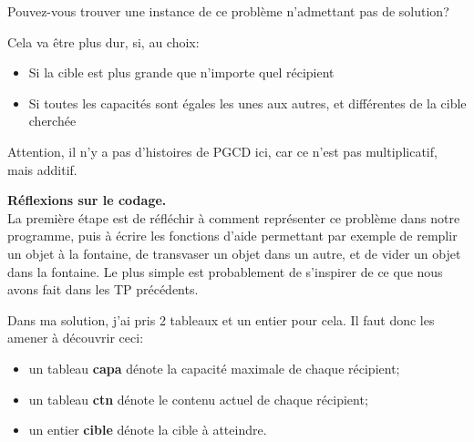 \documentclass[10pt]{article}\usepackage[nu]{esial}%
\begin{document}
\Question Pouvez-vous trouver une instance de ce problème n'admettant pas de
solution?
\begin{Reponse}
  \noindent
  Cela va être plus dur, si, au choix:
  \begin{itemize}
  \item Si la cible est plus grande que n'importe quel récipient
  \item Si toutes les capacités sont égales les unes aux autres, et différentes
    de la cible cherchée
  \end{itemize}
  Attention, il n'y a pas d'histoires de PGCD ici, car ce n'est pas
  multiplicatif, mais additif.
\end{Reponse}

\Exercice\textbf{Réflexions sur le codage.}\\
La première étape est de réfléchir à comment représenter ce problème dans notre
programme, puis à écrire les fonctions d'aide permettant par exemple de remplir
un objet à la fontaine, de transvaser un objet dans un autre, et de vider un
objet dans la fontaine. Le plus simple est probablement de s'inspirer de ce que
nous avons fait dans les TP précédents.

\begin{Reponse}
  Dans ma solution, j'ai pris 2 tableaux et un entier pour cela. Il faut donc
  les amener à découvrir ceci:
  \begin{itemize}
  \item un tableau \textbf{capa} dénote la capacité maximale de chaque récipient;
  \item un tableau \textbf{ctn} dénote le contenu actuel de chaque récipient;
  \item un entier \textbf{cible} dénote la cible à atteindre.
  \end{itemize}

  \newcommand*\FancyVerbStartString{// BEGIN HELPERS}
  \newcommand*\FancyVerbStopString{// END HELPERS}

\end{Reponse}


\end{document}
